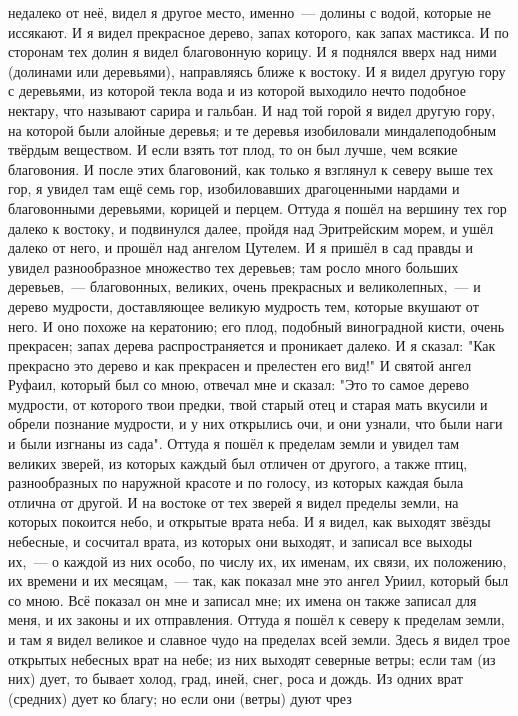 недалеко от неё, видел я другое место, именно~--- долины с водой, которые не
иссякают.
И я видел прекрасное дерево, запах которого, как запах мастикса.
И по сторонам тех долин я видел благовонную корицу.
И я поднялся вверх над ними (долинами или деревьями), направляясь
ближе к востоку.
И я видел другую гору с деревьями, из которой текла вода и из
которой выходило нечто подобное нектару, что называют сарира и гальбан.
И  над той горой я видел другую гору, на которой были алойные
деревья; и те деревья изобиловали миндалеподобным твёрдым веществом.
И если взять тот плод, то он был лучше, чем всякие благовония.
И после этих благовоний, как только я взглянул к северу выше тех
гор, я увидел там ещё семь гор, изобиловавших драгоценными нардами и
благовонными деревьями, корицей и перцем.
Оттуда я пошёл на вершину тех гор далеко к востоку, и подвинулся
далее, пройдя над Эритрейским морем, и ушёл далеко от него, и прошёл над
ангелом Цутелем.
И я пришёл в сад правды и увидел разнообразное множество тех
деревьев; там росло много больших деревьев,~--- благовонных, великих, очень
прекрасных и великолепных,~--- и дерево мудрости, доставляющее великую мудрость
тем, которые вкушают от него.
И оно похоже на кератонию; его плод, подобный виноградной кисти,
очень прекрасен; запах дерева распространяется и проникает далеко.
И я сказал: "Как прекрасно это дерево и как прекрасен и прелестен его
вид!"
И святой ангел Руфаил, который был со мною, отвечал мне и сказал:
"Это то самое дерево мудрости, от которого твои предки, твой старый отец и
старая мать вкусили и обрели познание мудрости, и у них открылись очи, и они
узнали, что были наги и были изгнаны из сада".
Оттуда я пошёл к пределам земли и увидел там великих зверей, из
которых каждый был отличен от другого, а также птиц, разнообразных по наружной
красоте и по голосу, из которых каждая была отлична от другой.
И на востоке от тех зверей я видел пределы земли, на которых покоится
небо, и открытые врата неба.
И я видел, как выходят звёзды небесные, и сосчитал врата, из которых
они выходят, и записал все выходы их,~--- о каждой из них особо, по числу их, их
именам, их связи, их положению, их времени и их месяцам,~--- так, как показал мне
это ангел Уриил, который был со мною.
Всё показал он мне и записал мне; их имена он также записал для меня,
и их законы и их отправления.
Оттуда я пошёл к северу к пределам земли, и там я видел великое
и славное чудо на пределах всей земли.
Здесь я видел трое открытых небесных врат на небе; из них выходят
северные ветры; если там (из них) дует, то бывает холод, град, иней, снег, роса
и дождь.
Из одних врат (средних) дует ко благу; но если они (ветры) дуют чрез
